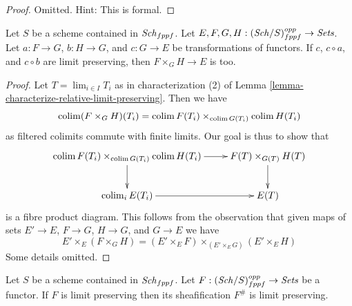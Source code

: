 \begin{proof}
Omitted. Hint: This is formal.
\end{proof}

\begin{lemma}
\label{lemma-fibre-product-locally-finite-presentation}
Let $S$ be a scheme contained in $\mathit{Sch}_{fppf}$.
Let $E, F, G, H : (\mathit{Sch}/S)_{fppf}^{opp} \to \textit{Sets}$.
Let $a : F \to G$, $b : H \to G$, and $c : G \to E$
be transformations of functors. If $c$, $c \circ a$, and $c \circ b$
are limit preserving, then $F \times_G H \to E$ is too.
\end{lemma}

\begin{proof}
Let $T = \lim_{i \in I} T_i$ as in characterization (2) of
Lemma \ref{lemma-characterize-relative-limit-preserving}.
Then we have
$$
\mathop{\mathrm{colim}}\nolimits (F \times_G H)(T_i) =
\mathop{\mathrm{colim}}\nolimits F(T_i) \times_{\mathop{\mathrm{colim}}\nolimits G(T_i)} \mathop{\mathrm{colim}}\nolimits H(T_i)
$$
as filtered colimits commute with finite limits. Our goal is thus to
show that
$$
\xymatrix{
\colim F(T_i) \times_{\colim G(T_i)} \colim H(T_i) \ar[r] \ar[d] &
F(T) \times_{G(T)} H(T) \ar[d] \\
\colim_i E(T_i) \ar[r] & E(T)
}
$$
is a fibre product diagram. This follows from the observation that
given maps of sets $E' \to E$, $F \to G$, $H \to G$, and $G \to E$
we have
$$
E' \times_E (F \times_G H) =
(E' \times_E F) \times_{(E' \times_E G)} (E' \times_E H)
$$
Some details omitted.
\end{proof}

\begin{lemma}
\label{lemma-sheafify-finite-presentation}
Let $S$ be a scheme contained in $\mathit{Sch}_{fppf}$.
Let $F : (\mathit{Sch}/S)_{fppf}^{opp} \to \textit{Sets}$ be a functor.
If $F$ is limit preserving then its sheafification $F^\#$ is limit preserving.
\end{lemma}

